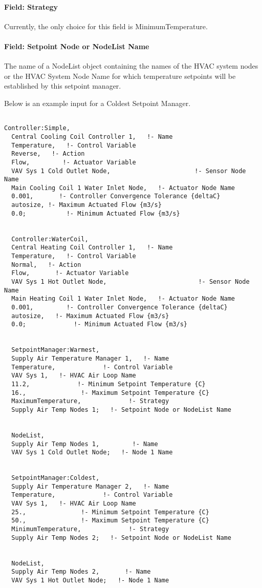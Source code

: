 \paragraph{Field: Strategy}\label{field-strategy-1}

Currently, the only choice for this field is MinimumTemperature.

\paragraph{Field: Setpoint Node or NodeList Name}\label{field-setpoint-node-or-nodelist-name-11}

The name of a NodeList object containing the names of the HVAC system nodes or the HVAC System Node Name for which temperature setpoints will be established by this setpoint manager.

Below is an example input for a Coldest Setpoint Manager.

\begin{lstlisting}

Controller:Simple,
  Central Cooling Coil Controller 1,   !- Name
  Temperature,   !- Control Variable
  Reverse,   !- Action
  Flow,         !- Actuator Variable
  VAV Sys 1 Cold Outlet Node,                       !- Sensor Node Name
  Main Cooling Coil 1 Water Inlet Node,   !- Actuator Node Name
  0.001,       !- Controller Convergence Tolerance {deltaC}
  autosize, !- Maximum Actuated Flow {m3/s}
  0.0;           !- Minimum Actuated Flow {m3/s}


  Controller:WaterCoil,
  Central Heating Coil Controller 1,   !- Name
  Temperature,   !- Control Variable
  Normal,   !- Action
  Flow,       !- Actuator Variable
  VAV Sys 1 Hot Outlet Node,                         !- Sensor Node Name
  Main Heating Coil 1 Water Inlet Node,   !- Actuator Node Name
  0.001,         !- Controller Convergence Tolerance {deltaC}
  autosize,   !- Maximum Actuated Flow {m3/s}
  0.0;             !- Minimum Actuated Flow {m3/s}


  SetpointManager:Warmest,
  Supply Air Temperature Manager 1,   !- Name
  Temperature,             !- Control Variable
  VAV Sys 1,   !- HVAC Air Loop Name
  11.2,             !- Minimum Setpoint Temperature {C}
  16.,               !- Maximum Setpoint Temperature {C}
  MaximumTemperature,             !- Strategy
  Supply Air Temp Nodes 1;   !- Setpoint Node or NodeList Name


  NodeList,
  Supply Air Temp Nodes 1,         !- Name
  VAV Sys 1 Cold Outlet Node;   !- Node 1 Name


  SetpointManager:Coldest,
  Supply Air Temperature Manager 2,   !- Name
  Temperature,             !- Control Variable
  VAV Sys 1,   !- HVAC Air Loop Name
  25.,               !- Minimum Setpoint Temperature {C}
  50.,               !- Maximum Setpoint Temperature {C}
  MinimumTemperature,             !- Strategy
  Supply Air Temp Nodes 2;   !- Setpoint Node or NodeList Name


  NodeList,
  Supply Air Temp Nodes 2,       !- Name
  VAV Sys 1 Hot Outlet Node;   !- Node 1 Name
\end{lstlisting}


